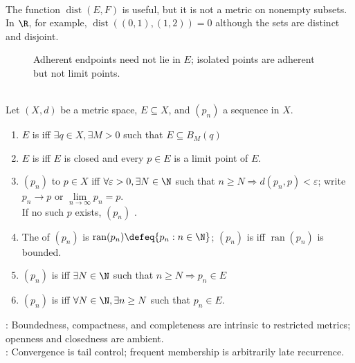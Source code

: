 \begin{remark} \label{rem:set-distance-is-not-subset-metric} \\
The function $\operatorname{dist}(E,F)$ is useful, but it is not a metric on nonempty subsets.\\
In $\R$, for example, $\operatorname{dist}((0,1),(1,2))=0$ although the sets are distinct and disjoint.
\end{remark}

\begin{figure}[H]
  \centering
  
  \caption{Adherent endpoints need not lie in $E$; isolated points are adherent but not limit points.}
  \label{fig:adherent-limit-isolated-points}
\end{figure}

\begin{definition} \label{def:bounded-and-perfect-metric-sets}\label{rem:boundedness-and-intrinsic-metric-properties}\label{per:metric-sequences-as-topological-tests}\label{def:sequence-convergence-metric}\label{def:sequences-core-definitions-source-todo}\label{def:sequence-range-and-boundedness}\label{def:eventually-and-frequently-in-a-set} \\
Let $(X,d)$ be a metric space, $E\subseteq X$, and $(p_n)$ a sequence in $X$.
\begin{enumerate}[label=(\roman*)]
\setlength{\itemsep}{0pt}
\item $E$ is  iff $\exists q\in X,\exists M>0$ such that $E\subseteq B_M(q)$
\item $E$ is  iff $E$ is closed and every $p\in E$ is a limit point of $E$.
\item $(p_n)$  to $p\in X$ iff $\forall\varepsilon>0,\exists N\in\N$ such that $n\geq N\Longrightarrow d(p_n,p)<\varepsilon$; write $p_n\to p$ or $\lim\limits_{n\to\infty}p_n=p$.\\
If no such $p$ exists, $(p_n)$ .
\item The  of $(p_n)$ is $\operatorname{ran}(p_n)\defeq\{p_n:n\in\N\}$; $(p_n)$ is  iff $\operatorname{ran}(p_n)$ is bounded.
\item $(p_n)$ is  iff $\exists N\in\N$ such that $n\geq N\Longrightarrow p_n\in E$
\item $(p_n)$ is  iff $\forall N\in\N,\exists n\geq N$ such that $p_n\in E$.
\end{enumerate}
: Boundedness, compactness, and completeness are intrinsic to restricted metrics; openness and closedness are ambient.\\
: Convergence is tail control; frequent membership is arbitrarily late recurrence.
\end{definition}


